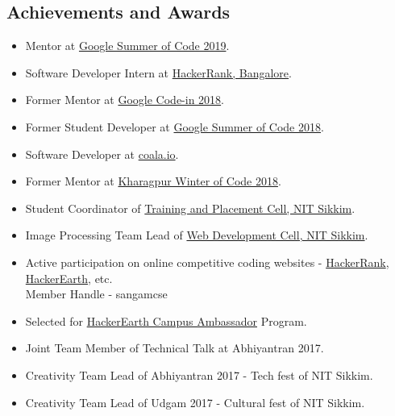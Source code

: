 \documentclass[margin, centered]{res}
\begin{document}
\begin{resume}
        \section{Achievements and Awards}
            \begin{itemize}[leftmargin=*]
                \item Mentor at \href{https://summerofcode.withgoogle.com/}{Google Summer of Code 2019}.
                \item Software Developer Intern at \href{https://www.hackerrank.com}{HackerRank, Bangalore}.
                \item Former Mentor at \href{https://codein.withgoogle.com}{Google Code-in 2018}.
                \item Former Student Developer at \href{https://summerofcode.withgoogle.com/}{Google Summer of Code 2018}.
                \item Software Developer at \href{https://coala.io}{coala.io}.
                \item Former Mentor at \href{https://kwoc.kossiitkgp.org/}{Kharagpur Winter of Code 2018}.
                \item Student Coordinator of \href{http://placement.nitsikkim.ac.in/}{Training and Placement Cell, NIT Sikkim}.
                \item Image Processing Team Lead of \href{https://nitsikkim.ac.in/webdevelopmentcell}{Web Development Cell, NIT Sikkim}.
                \item Active participation on online competitive coding websites - \href{https://www.hackerrank.com/sangamcse}{HackerRank},
                    \href{https://www.hackerearth.com/@damonsangam}{HackerEarth}, etc. \\
                    Member Handle - sangamcse
                \item Selected for \href{https://www.hackerearth.com/university}{HackerEarth Campus Ambassador} Program.
                \item Joint Team Member of Technical Talk at Abhiyantran 2017.
                \item Creativity Team Lead of Abhiyantran 2017 - Tech fest of NIT Sikkim.
                \item Creativity Team Lead of Udgam 2017 - Cultural fest of NIT Sikkim.
            \end{itemize}


\end{resume}
\end{document}
